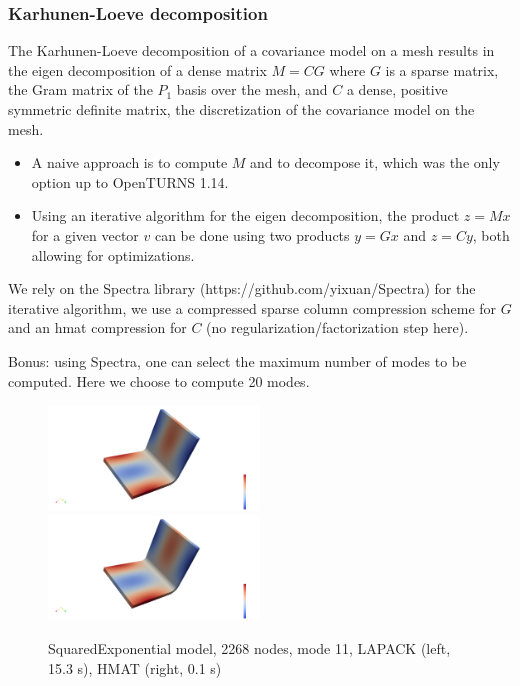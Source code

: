 \documentclass{beamer}
\begin{document}
\begin{frame}
\frametitle{Karhunen-Loeve decomposition}

The Karhunen-Loeve decomposition of a covariance model on a mesh results in the eigen decomposition of a dense matrix $M=CG$ where $G$ is a sparse matrix, the Gram matrix of the $P_1$ basis over the mesh, and $C$ a dense, positive symmetric definite matrix, the discretization of the covariance model on the mesh.

\begin{itemize}
\item A naive approach is to compute $M$ and to decompose it, which was the only option up to OpenTURNS 1.14.
\item Using an iterative algorithm for the eigen decomposition, the product $z=Mx$ for a given vector $v$ can be done using two products $y=Gx$ and $z=Cy$, both allowing for optimizations.
\end{itemize}

We rely on the \alert{Spectra} library (https://github.com/yixuan/Spectra) for the iterative algorithm, we use a compressed sparse column compression scheme for $G$ and an hmat compression for $C$ (no regularization/factorization step here).

\alert{Bonus: using Spectra, one can select the maximum number of modes to be computed. Here we choose to compute 20 modes}.

\begin{figure}
\begin{center}
\includegraphics[width=0.5\textwidth]{figures/kl_lapack.png}%
\includegraphics[width=0.5\textwidth]{figures/kl_hmat.png}
\end{center}
\caption{SquaredExponential model, 2268 nodes, mode 11, LAPACK (left, 15.3 s), HMAT (right, 0.1 s)}
\end{figure}


\end{frame}
\end{document}
